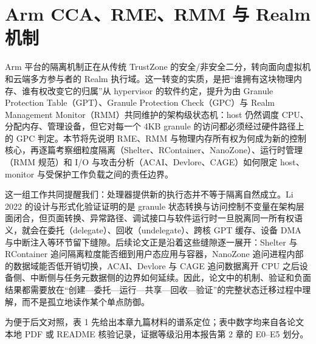 \documentclass[11pt]{ctexart}
\begin{document}
\section{Arm CCA、RME、RMM 与 Realm 机制}
Arm 平台的隔离机制正在从传统 TrustZone 的安全/非安全二分，转向面向虚拟机和云端多方参与者的 Realm 执行域。这一转变的实质，是把“谁拥有这块物理内存、谁有权改变它的归属”从 hypervisor 的软件约定，提升为由 Granule Protection Table（GPT）、Granule Protection Check（GPC）与 Realm Management Monitor（RMM）共同维护的架构级状态机：host 仍然调度 CPU、分配内存、管理设备，但它对每一个 4KB granule 的访问都必须经过硬件路径上的 GPC 判定。本节将先说明 RME、RMM 与物理内存所有权为何成为新的控制核心，再逐篇考察细粒度隔离（Shelter、RContainer、NanoZone）、运行时管理（RMM 规范）和 I/O 与攻击分析（ACAI、Devlore、CAGE）如何限定 host、monitor 与受保护工作负载之间的责任边界。\par
这一组工作共同提醒我们：处理器提供新的执行态并不等于隔离自然成立。Li 2022 的设计与形式化验证证明的是 granule 状态转换与访问控制不变量在架构层面闭合，但页面转换、异常路径、调试接口与软件运行时一旦脱离同一所有权语义，就会在委托（delegate）、回收（undelegate）、跨核 GPT 缓存、设备 DMA 与中断注入等环节留下缝隙。后续论文正是沿着这些缝隙逐一展开：Shelter 与 RContainer 追问隔离粒度能否细到用户态应用与容器，NanoZone 追问进程内部的数据域能否低开销切换，ACAI、Devlore 与 CAGE 追问数据离开 CPU 之后设备侧、中断侧与任务元数据侧的边界如何延续。因此，论文中的机制、验证和负面结果都需要放在“创建—委托—运行—共享—回收—验证”的完整状态迁移过程中理解，而不是孤立地读作某个单点防御。\par
为便于后文对照，表 1 先给出本章九篇材料的谱系定位；表中数字均来自各论文本地 PDF 或 README 核验记录，证据等级沿用本报告第 2 章的 E0--E5 划分。\par
\end{document}
